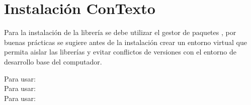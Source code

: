 \documentclass[letterpaper,10pt,openany,spanish]{sphinxmanual}
\begin{document}
\section{Instalación ConTexto}
\label{\detokenize{instalacion/instalacion_contexto:instalacion-contexto}}\label{\detokenize{instalacion/instalacion_contexto:instalacion-basica}}\label{\detokenize{instalacion/instalacion_contexto::doc}}
Para la instalación de la librería se debe utilizar el gestor de paquetes , por buenas prácticas se sugiere antes de la instalación crear un entorno virtual que permita aislar las librerías y evitar conflictos de versiones con el entorno de desarrollo base del computador.
\begin{quote}

\begin{sphinxVerbatim}[commandchars=\\\{\}]
\end{sphinxVerbatim}
\end{quote}
\begin{description}
\item[{Para  usar:}] \leavevmode
\begin{sphinxVerbatim}[commandchars=\\\{\}]
\end{sphinxVerbatim}

\item[{Para  usar:}] \leavevmode
\begin{sphinxVerbatim}[commandchars=\\\{\}]
\end{sphinxVerbatim}

\item[{Para  usar:}] \leavevmode
\begin{sphinxVerbatim}[commandchars=\\\{\}]
\end{sphinxVerbatim}

\end{description}
\end{document}
